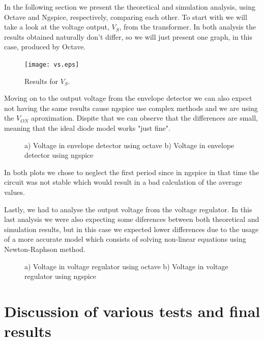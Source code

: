 In the following section we present the theoretical and simulation analysis, using Octave and Ngspice, respectively, comparing each other. To start with we will take a look at the voltage output, $V_S$,
from the transformer. In both analysis the results obtained naturally don't differ, so we will just present one graph, in this case, produced by Octave.

\begin{figure}[h] \centering
\texttt{[image: vs.eps]}
\caption{Results for $V_S$.}
\label{fig:1}
\end{figure}

Moving on to the output voltage from the envelope detector we can also expect not having the same results cause ngspice use complex methods and we are using the $V_{ON}$ aproximation.
Dispite that we can observe that the differences are small, meaning that the ideal diode model works "just fine". 
\vspace{-2cm}
\begin{figure}[h!]
            \centering
            \caption{a) Voltage in envelope detector using octave b) Voltage in envelope detector using ngspice}
            \label{fig:2}
\end{figure}

In both plots we chose to neglect the first period since in ngspice in that time the circuit was not stable which would result in a bad calculation of the average values. 

Lastly, we had to analyse the output voltage from the voltage regulator. In this last analysis we were also expecting some diferences between both theoretical and simulation results, but in this case we
expected lower differences due to the usage of a more accurate model which consists of solving non-linear equations using Newton-Raphson method.  

\begin{figure}[h!]
            \centering
            \caption{a) Voltage in voltage regulator using octave b) Voltage in voltage regulator using ngspice}
            \label{fig:3}
\end{figure}

\section{Discussion of various tests and final results}

